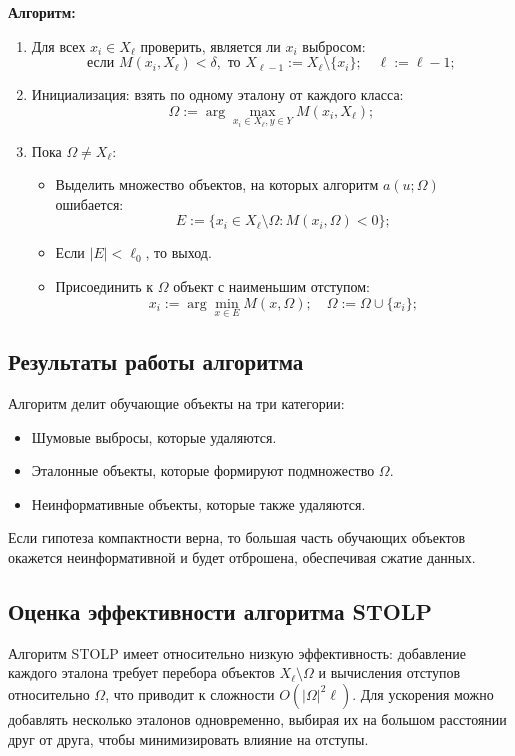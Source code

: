 \textbf{Алгоритм:}
\begin{enumerate}
    \item Для всех \( x_i \in X_\ell \) проверить, является ли \( x_i \) выбросом:
    \[
    \text{если } M(x_i, X_\ell) < \delta, \text{ то } X_{\ell-1} := X_\ell \setminus \{x_i\}; \quad \ell := \ell - 1;
    \]
    \item Инициализация: взять по одному эталону от каждого класса:
    \[
    \Omega := \arg \max_{x_i \in X_\ell, y \in Y} M(x_i, X_\ell);
    \]
    \item Пока \( \Omega \neq X_\ell \):
    \begin{itemize}
        \item Выделить множество объектов, на которых алгоритм \( a(u; \Omega) \) ошибается:
        \[
        E := \{x_i \in X_\ell \setminus \Omega : M(x_i, \Omega) < 0\};
        \]
        \item Если \( |E| < \ell_0 \), то выход.
        \item Присоединить к \( \Omega \) объект с наименьшим отступом:
        \[
        x_i := \arg \min_{x \in E} M(x, \Omega); \quad \Omega := \Omega \cup \{x_i\};
        \]
    \end{itemize}
\end{enumerate}



\subsection*{Результаты работы алгоритма}
Алгоритм делит обучающие объекты на три категории:
\begin{itemize}
    \item Шумовые выбросы, которые удаляются.
    \item Эталонные объекты, которые формируют подмножество $\Omega$.
    \item Неинформативные объекты, которые также удаляются.
\end{itemize}

Если гипотеза компактности верна, то большая часть обучающих объектов окажется неинформативной и будет отброшена, обеспечивая сжатие данных.

\subsection*{Оценка эффективности алгоритма STOLP}
Алгоритм STOLP имеет относительно низкую эффективность: добавление каждого эталона требует перебора объектов \( X_\ell \setminus \Omega \) и вычисления отступов относительно \( \Omega \), что приводит к сложности \( O(|\Omega|^2 \ell) \). Для ускорения можно добавлять несколько эталонов одновременно, выбирая их на большом расстоянии друг от друга, чтобы минимизировать влияние на отступы.


